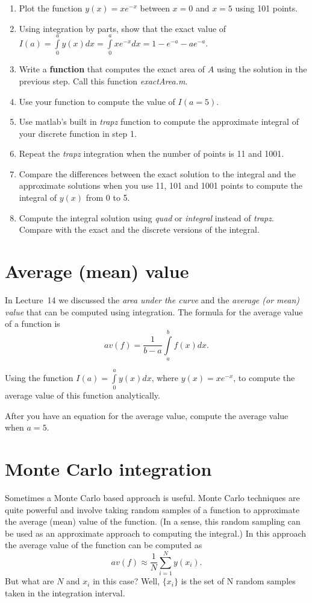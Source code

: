 \documentclass[10pt,fleqn]{article}
\begin{document}
\begin{enumerate}
	\item Plot the function $y(x)=xe^{-x}$ between $x=0$ and $x=5$ using 101 points.
	\item Using integration by parts, show that the exact value of $I(a) = \int\limits_0^a y(x) dx = \int \limits_0^a xe^{-x} dx = 1-e^{-a} - ae^{-a}$.
	\item Write a \textbf{function} that computes the exact area of $A$ using the solution in the previous step. Call this function \textit{exactArea.m}.
	\item Use your function to compute the value of $I(a=5)$.
	\item Use matlab's built in \textit{trapz} function to compute the approximate integral of your discrete function in step 1.
	\item Repeat the \textit{trapz} integration when the number of points is 11 and 1001. 
	\item Compare the differences between the exact solution to the integral and the approximate solutions when you use 11, 101 and 1001 points to compute the integral of $y(x)$ from 0 to 5.
	\item Compute the integral solution using \textit{quad} or \textit{integral} instead of \textit{trapz}. Compare with the exact and the discrete versions of the integral.
\end{enumerate}

\section*{Average (mean) value}

In Lecture~14 we discussed the \textit{area under the curve} and the \textit{average (or mean) value} that can be computed using integration. The formula for the average value of a function is $$av(f) = \frac{1}{b-a} \int \limits_a^b f(x) dx.$$

Using the function $I(a) = \int\limits_0^a y(x) dx$, where $y(x)=xe^{-x}$, to compute the average value of this function analytically.

After you have an equation for the average value, compute the average value when $a=5$.

\section*{Monte Carlo integration}

Sometimes a Monte Carlo based approach is useful. Monte Carlo techniques are quite powerful and involve taking random samples of a function to approximate the average (mean) value of the function. (In a sense, this random sampling can be used as an approximate approach to computing the integral.) In this approach the average value of the function can be computed as $$ av(f) \approx \frac{1}{N} \sum\limits_{i=1}^N y(x_i).$$
But what are $N$ and $x_i$ in this case? Well, $ \{ x_i \}$ is the set of N random samples taken in the integration interval.
\end{document}
